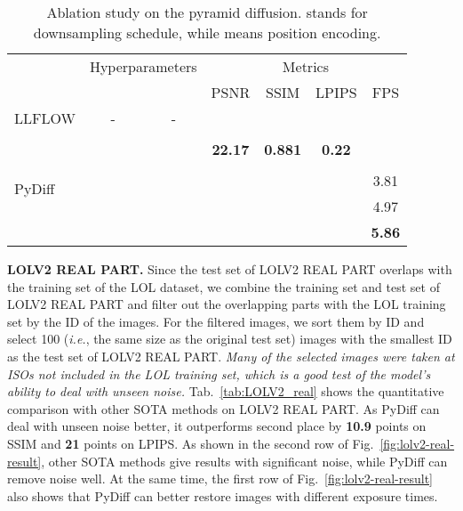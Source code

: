 \documentclass{article}
\def\ie{\emph{i.e.}}
\begin{document}
\begin{table}[tb]
\setlength{\tabcolsep}{3pt}
\renewcommand{\arraystretch}{0.9} \small
\centering

\begin{tabular}{lcccccc}
\toprule

\multirow{2}{*}{}
& \multicolumn{2}{c}{Hyperparameters}  & \multicolumn{4}{c}{Metrics} \\

\cmidrule(lr){2-3} \cmidrule(lr){4-7}


 &  &  & PSNR & SSIM
& LPIPS & FPS \\

\midrule

LLFLOW & - & -  &   &  &  &   \\

\midrule

\multirow{6}{*}{PyDiff} 
&  &   &   &  &  &   \\
&  &   & \textbf{22.17}  & \textbf{0.881} & \textbf{0.22} &   \\
&   &   &   &  &  &  \\
    






 &  &   &   &  &  & 3.81  \\
 &  &   &   &  &  & 4.97  \\
 &  &   &   &  &  & \textbf{5.86}  \\


\bottomrule

\end{tabular}
\caption{Ablation study on the pyramid diffusion.  stands for downsampling schedule, while  means position encoding.}
\label{tab:pyr-abl}
\end{table}




\noindent \textbf{LOLV2 REAL PART.}
Since the test set of LOLV2 REAL PART overlaps with the training set of the LOL dataset, we combine the training set and test set of LOLV2 REAL PART and filter out the overlapping parts with the LOL training set by the ID of the images. For the filtered images, we sort them by ID and select 100 (\ie, the same size as the original test set) images with the smallest ID as the test set of LOLV2 REAL PART. \emph{Many of the selected images were taken at ISOs not included in the LOL training set, which is a good test of the model's ability to deal with unseen noise.} Tab.~\ref{tab:LOLV2_real} shows the quantitative comparison with other SOTA methods on LOLV2 REAL PART. As PyDiff can deal with unseen noise better, it outperforms second place by \textbf{10.9} points on SSIM and \textbf{21} points on LPIPS. As shown in the second row of Fig.~\ref{fig:lolv2-real-result}, other SOTA methods give results with significant noise, while PyDiff can remove noise well. At the same time, the first row of Fig.~\ref{fig:lolv2-real-result} also shows that PyDiff can better restore images with different exposure times.
\end{document}
